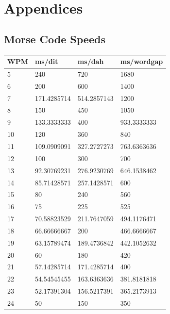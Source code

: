 \documentclass[a4paper]{tufte-handout}
\begin{document}
\pagebreak
\appendix
\section*{Appendices}
\renewcommand{\thesubsection}{\Alph{subsection}}

\subsection{Morse Code Speeds}

    \begin{table}[!h]
        \footnotesize
        \centering
        \selectfont
        \begin{tabular}{llll}
            \toprule
            WPM & ms/dit & ms/dah & ms/wordgap \\
            \midrule
            5 & 240 & 720 & 1680 \\
            6 & 200 & 600 & 1400 \\
            7 & 171.4285714 & 514.2857143 & 1200 \\
            8 & 150 & 450 & 1050 \\
            9 & 133.3333333 & 400 & 933.3333333 \\
            10 & 120 & 360 & 840 \\
            11 & 109.0909091 & 327.2727273 & 763.6363636 \\
            12 & 100 & 300 & 700 \\
            13 & 92.30769231 & 276.9230769 & 646.1538462 \\
            14 & 85.71428571 & 257.1428571 & 600 \\
            15 & 80 & 240 & 560 \\
            16 & 75 & 225 & 525 \\
            17 & 70.58823529 & 211.7647059 & 494.1176471 \\
            18 & 66.66666667 & 200 & 466.6666667 \\
            19 & 63.15789474 & 189.4736842 & 442.1052632 \\
            20 & 60 & 180 & 420 \\
            21 & 57.14285714 & 171.4285714 & 400 \\
            22 & 54.54545455 & 163.6363636 & 381.8181818 \\
            23 & 52.17391304 & 156.5217391 & 365.2173913 \\
            24 & 50 & 150 & 350 \\

\end{tabular}
\end{table}
\end{document}
